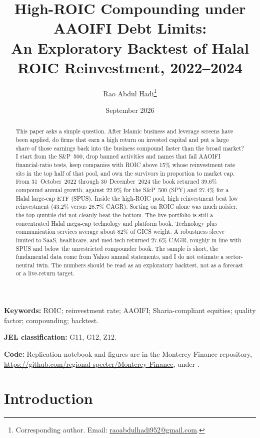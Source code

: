 \documentclass[11pt,letterpaper]{article}
\title{\textbf{High-ROIC Compounding under AAOIFI Debt Limits:\\
An Exploratory Backtest of Halal ROIC Reinvestment, 2022--2024}}
\author[1]{Rao Abdul Hadi\thanks{Corresponding author. Email: \href{mailto:raoabdulhadi952@gmail.com}{raoabdulhadi952@gmail.com}.}}
\affil[1]{Monterey Finance, Halal Quant Research Lab}
\date{September 2026}
\begin{document}
\maketitle

\begin{abstract}
\noindent
This paper asks a simple question. After Islamic business and leverage screens have been applied, do firms that earn a high return on invested capital and put a large share of those earnings back into the business compound faster than the broad market? I start from the S\&P~500, drop banned activities and names that fail AAOIFI financial-ratio tests, keep companies with ROIC above 15\% whose reinvestment rate sits in the top half of that pool, and own the survivors in proportion to market cap. From 31~October~2022 through 30~December~2024 the book returned 39.6\% compound annual growth, against 22.9\% for the S\&P~500 (SPY) and 27.4\% for a Halal large-cap ETF (SPUS). Inside the high-ROIC pool, high reinvestment beat low reinvestment (43.2\% versus 28.7\% CAGR). Sorting on ROIC alone was much noisier: the top quintile did not cleanly beat the bottom. The live portfolio is still a concentrated Halal mega-cap technology and platform book. Technology plus communication services average about 82\% of GICS weight. A robustness sleeve limited to SaaS, healthcare, and med-tech returned 27.6\% CAGR, roughly in line with SPUS and below the unrestricted compounder book. The sample is short, the fundamental data come from Yahoo annual statements, and I do not estimate a sector-neutral twin. The numbers should be read as an exploratory backtest, not as a forecast or a live-return target.
\end{abstract}

\noindent\textbf{Keywords:}
ROIC; reinvestment rate; AAOIFI; Sharia-compliant equities; quality factor; compounding; backtest.

\noindent\textbf{JEL classification:} G11, G12, Z12.

\noindent\textbf{Code:}
Replication notebook and figures are in the Monterey Finance repository,
\url{https://github.com/regional-specter/Monterey-Finance},
under .

\section{Introduction}
\end{document}
